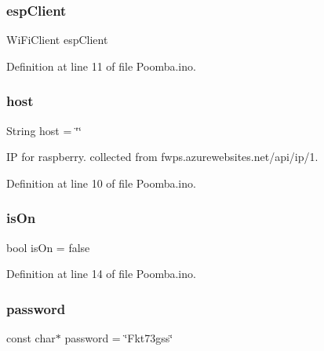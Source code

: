 \mbox{\label{_poomba_8ino_abd77e757e4b3bb6f1e4b42b21ea9e040}} 
\subsubsection{\texorpdfstring{esp\+Client}{espClient}}
{\footnotesize\ttfamily Wi\+Fi\+Client esp\+Client}



Definition at line 11 of file Poomba.\+ino.

\mbox{\label{_poomba_8ino_a2502b12b30261ef4dea2ff97a6b78cab}} 
\subsubsection{\texorpdfstring{host}{host}}
{\footnotesize\ttfamily String host = \char`\"{}\char`\"{}}



IP for raspberry. collected from fwps.\+azurewebsites.\+net/api/ip/1. 



Definition at line 10 of file Poomba.\+ino.

\mbox{\label{_poomba_8ino_ae530c5af75c42fc2bd1fb588c38aa332}} 
\subsubsection{\texorpdfstring{is\+On}{isOn}}
{\footnotesize\ttfamily bool is\+On = false}



Definition at line 14 of file Poomba.\+ino.

\mbox{\label{_poomba_8ino_aa4a2ebcb494493f648ae1e6975672575}} 
\subsubsection{\texorpdfstring{password}{password}}
{\footnotesize\ttfamily const char$\ast$ password = \char`\"{}Fkt73gss\char`\"{}}



